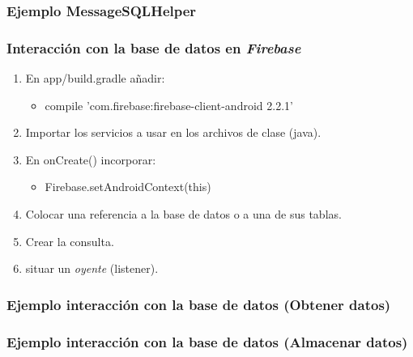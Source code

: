 \begin{frame}
	\frametitle{Ejemplo {\ttfamily MessageSQLHelper}}
	
\end{frame}


\begin{frame}
	\frametitle{Interacción con la base de datos en {\it Firebase}}
		\begin{enumerate}
			\item En {\ttfamily app/build.gradle} añadir:
				\begin{itemize}
					\item {\ttfamily compile 'com.firebase:firebase-client-android 2.2.1'}
				\end{itemize}
			\item Importar los servicios a usar en los archivos de clase ({\ttfamily java}).
			\item  En {\ttfamily onCreate()} incorporar:
				\begin{itemize}
					\item {\ttfamily Firebase.setAndroidContext(this)}
				\end{itemize}
			\item Colocar una referencia a la base de datos o a una de sus tablas.
			\item Crear la consulta.
			\item situar un {\it oyente} ({\ttfamily listener}).
		\end{enumerate}
	\endblock{}
\end{frame}


\begin{frame}
	\frametitle{Ejemplo interacción con la base de datos (Obtener datos)}
	
\end{frame}


\begin{frame}
	\frametitle{Ejemplo interacción con la base de datos (Almacenar datos)}
	
\end{frame}


